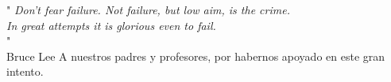 \begin{dedication}
    " \emph{Don't fear failure. 
    Not failure, but low aim, is the crime.\\ 
    In great attempts it is glorious even to fail.\\}"\\
    \hfill  Bruce Lee
    \newline
    \newline
    \newline
    \newline
    A nuestros padres y profesores, por habernos apoyado en este gran intento.

\end{dedication}